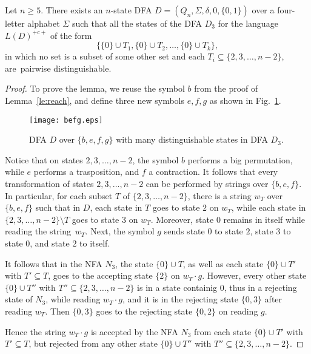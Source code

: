 \documentclass[runningheads]{llncs}
\begin{document}
\begin{lemma}\label{-----le4}\label{le:equiv}
 Let $n\ge5$.
 There exists an $n$-state DFA $D=(Q_n,\Sigma,\delta,0,\{0,1\})$
 over a four-letter  alphabet $\Sigma$
 such that all the states of the DFA $D_3$ for the language $L(D)^{+c+}$
 of the form
 $$
    \Big\{ \{0\}\cup T_1,  \{0\}\cup T_2,\ldots,  \{0\}\cup T_k \Big\},
 $$
 in which no set is a subset of some other set and 
 each $T_i\subseteq\{2,3,\ldots,n-2\}$,
 are~pairwise distinguishable.
\end{lemma} 

\begin{proof}
 To prove the lemma, we reuse the symbol $b$
 from the proof of Lemma~\ref{le:reach},
 and define three new symbols $e,f,g$
 as shown in Fig.~\ref{fig:befg}.

 \begin{figure}[t]\label{-----fig6}
 \centering
 \texttt{[image: befg.eps]}
 \caption{DFA $D$ over $\{b,e,f,g\}$ with many distinguishable states in 
         DFA $D_3$.}
 \label{fig:befg}
 \end{figure}
 
 Notice that on states $2,3,\ldots,n-2$,
 the symbol $b$ performs a big permutation,
 while $e$ performs a trasposition,
 and $f$  a contraction.
 It follows that every transformation of states $2,3,\ldots,n-2$
 can be performed by strings over $\{b,e,f\}$.
 In particular, for each subset $T$ of $\{2,3,\ldots,n-2\}$,
 there is a string $w_T$ over $\{b,e,f\}$
 such that in  $D$,
 each state in $T$ goes to state $2$ on $w_T$,
 while each state in $\{2,3,\ldots,n-2\}\setminus T$ 
 goes to state $3$ on $w_T$.
 Moreover, state $0$ remains in itself while reading the string~$w_T$.
 Next, the symbol $g$ sends state $0$ to state $2$,
 state $3$ to state $0$,
 and state $2$ to itself.

 It follows that in the NFA $N_3$,
 the  state $\{0\}\cup T$,
 as well as each state $\{0\}\cup T'$ with $T'\subseteq T$,
 goes to the accepting state $\{2\}$ on $w_T\cdot g$.
 However,
 every other state $\{0\}\cup T''$ with $T''\subseteq\{2,3,\ldots,n-2\}$
 is  in a state containig $0$,
 thus in a rejecting state of $N_3$,
 while reading $w_T\cdot g$, 
 and it is in the rejecting state $\{0,3\}$
 after reading $w_T$.
 Then $\{0,3\}$ goes to the rejecting state $\{0,2\}$ on reading $g$.
 
 Hence the string $w_T\cdot g$ is accepted by the NFA $N_3$
 from each state $\{0\}\cup T'$ with $T'\subseteq T$,
 but rejected from any other state $\{0\}\cup T''$
 with $T''\subseteq\{2,3,\ldots,n-2\}$.
 

\end{proof}
\end{document}

